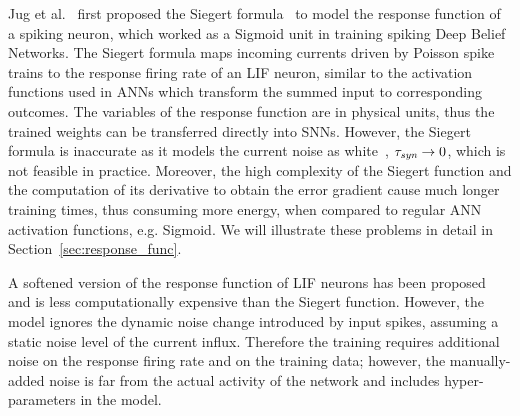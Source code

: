 	Jug et al.~\citep{Jug_etal_2012} first proposed the Siegert formula~\citep{siegert1951first} to model the response function of a spiking neuron, which worked as a Sigmoid unit in training spiking Deep Belief Networks.
	The Siegert formula maps incoming currents driven by Poisson spike trains to the response firing rate of an LIF neuron, similar to the activation functions used in ANNs which transform the summed input to corresponding outcomes.
	The variables of the response function are in physical units, thus the trained weights can be transferred directly into SNNs.
	However, the Siegert formula is inaccurate as it models the current noise as white~\citep{liu2016noisy}, $\tau_{\textit{\textrm{syn}}} \to 0$, which is not feasible in practice.
	Moreover, the high complexity of the Siegert function and the computation of its derivative to obtain the error gradient cause much longer training times, thus consuming more energy, when compared to regular ANN activation functions, e.g. Sigmoid.
	We will illustrate these problems in detail in Section~\ref{sec:response_func}. %
	
	A softened version of the response function of LIF neurons has been proposed~\citep{hunsberger2015spiking} and is less computationally expensive than the Siegert function.
	However, the model ignores the dynamic noise change introduced by input spikes, assuming a static noise level of the current influx.
	Therefore the training requires additional noise on the response firing rate and on the training data;
	however, the manually-added noise is far from the actual activity of the network and includes hyper-parameters in the model.
	
